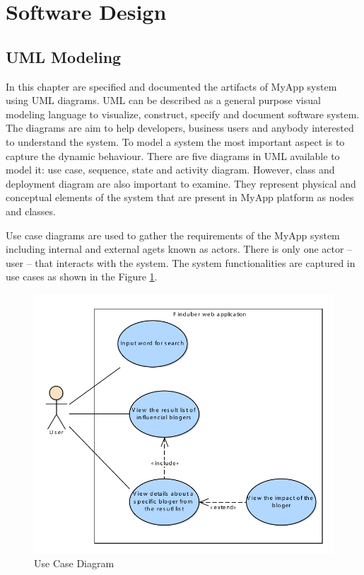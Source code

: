 \section{Software Design}
\subsection{UML Modeling}

In this chapter are specified and documented the artifacts of MyApp system using UML diagrams. UML can be described as a general purpose visual modeling language to visualize, construct, specify and document software system. The diagrams are aim to help developers, business users and anybody interested to understand the system. To model a system the most important aspect is to capture the dynamic behaviour. There are five diagrams in UML available to model it: use case, sequence, state and activity diagram. However, class and deployment diagram are also important to examine. They represent physical and conceptual elements of the system that are present in MyApp platform as nodes and classes.

Use case diagrams are used to gather the requirements of the MyApp system including internal and external agets known as actors. There is only one actor -- user -- that interacts with the system. The system functionalities are captured in use cases as shown in the Figure \ref{usecase_uml}.

\begin{figure}[!ht]
\centering
\includegraphics[width=15cm]{usecase}
\caption{Use Case Diagram}\label{usecase_uml}
\end{figure}


